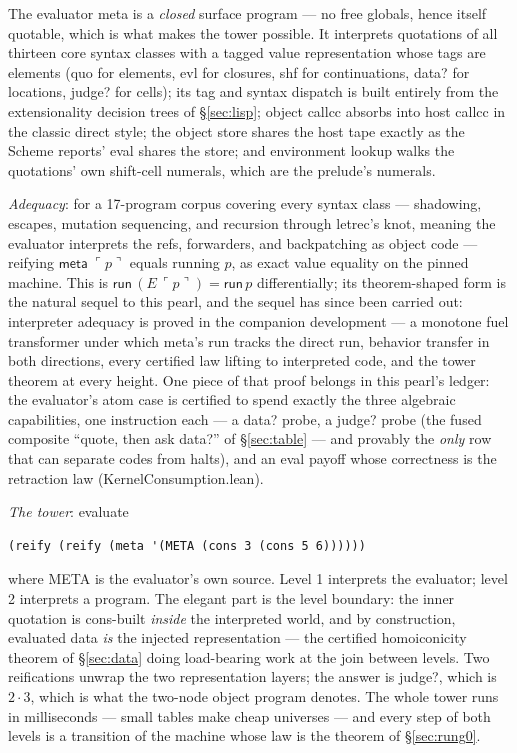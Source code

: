 \documentclass[acmsmall,screen,review]{acmart}
\begin{document}
The evaluator \textsf{meta} is a \emph{closed} surface program ---
no free globals, hence itself quotable, which is what makes the tower
possible. It interprets quotations of all thirteen core syntax
classes with a tagged value representation whose tags are elements
(\textsf{quo} for elements, \textsf{evl} for closures, \textsf{shf}
for continuations, \textsf{data?} for locations, \textsf{judge?} for
cells); its tag and syntax dispatch is built entirely from the
extensionality decision trees of \S\ref{sec:lisp}; object
\textsf{callcc} absorbs into host \textsf{callcc} in the classic
direct style; the object store shares the host tape exactly as the
Scheme reports' \textsf{eval} shares the store; and environment
lookup walks the quotations' own shift-cell numerals, which are the
prelude's numerals.

\emph{Adequacy}: for a 17-program corpus covering every syntax class ---
shadowing, escapes, mutation sequencing, and recursion through
\textsf{letrec}'s knot, meaning the evaluator interprets the refs,
forwarders, and backpatching as object code --- reifying
$\mathsf{meta}\;\ulcorner p \urcorner$ equals running $p$, as exact
value equality on the pinned machine. This is
$\mathsf{run}\,(E\,\ulcorner p\urcorner) = \mathsf{run}\,p$
differentially; its theorem-shaped form is the natural sequel to
this pearl, and the sequel has since been carried out: interpreter
adequacy is proved in the companion development --- a monotone fuel
transformer under which \textsf{meta}'s run tracks the direct run,
behavior transfer in both directions, every certified law lifting to
interpreted code, and the tower theorem at every height. One piece
of that proof belongs in this pearl's ledger: the evaluator's atom
case is certified to spend exactly the three algebraic capabilities,
one instruction each --- a \textsf{data?} probe, a \textsf{judge?}
probe (the fused composite ``quote, then ask \textsf{data?}'' of
\S\ref{sec:table} --- and provably the \emph{only} row that can
separate codes from halts), and an \textsf{eval} payoff whose
correctness is the retraction law
(\textsf{KernelConsumption.lean}).

\emph{The tower}: evaluate
\begin{lstlisting}
(reify (reify (meta '(META (cons 3 (cons 5 6))))))
\end{lstlisting}
where \textsf{META} is the evaluator's own source. Level 1 interprets
the evaluator; level 2 interprets a program. The elegant part is the
level boundary: the inner quotation is \textsf{cons}-built
\emph{inside} the interpreted world, and by construction, evaluated
data \emph{is} the injected representation --- the certified
homoiconicity theorem of \S\ref{sec:data} doing load-bearing work at
the join between levels. Two reifications unwrap the two
representation layers; the answer is \textsf{judge?}, which is
$2 \cdot 3$, which is what the two-node object program denotes. The
whole tower runs in milliseconds --- small tables make cheap
universes --- and every step of both levels is a transition of the
machine whose law is the theorem of \S\ref{sec:rung0}.
\end{document}
